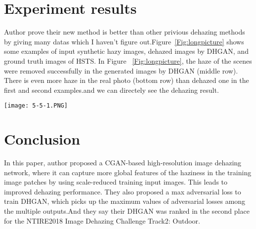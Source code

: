 \documentclass[10pt,twocolumn,letterpaper]{article}
\begin{document}
\section{Experiment results}
Author prove their new method is better than other privious dehazing methods by giving many datas which I haven't figure out.Figure~\ref{Fig:longpicture} shows some examples of input synthetic hazy images, dehazed images by DHGAN, and ground truth images of HSTS. In Figure ~\ref{Fig:longpicture}, the haze of the scenes were removed successfully in the generated images by DHGAN (middle row). There is even more haze in the real photo (bottom row) than dehazed one in the first and second examples.and we can directely see the dehazing result.

\begin{figure*}[htp]
\centering
\texttt{[image: 5-5-1.PNG]}
\caption{Some examples of (top row) input synthetic hazy images, (middle row) dehazed images by DHGAN and (bottom row) ground truth images of HSTS}
\label{Fig:longpicture}
\end{figure*}

\section{Conclusion}
In this paper, author proposed a CGAN-based high-resolution image dehazing network, where it can capture more global features of the haziness in the training image patches by using scale-reduced training input images. This leads to improved dehazing performance. They also proposed a max adversarial loss to train DHGAN, which picks up the maximum values of adversarial losses among
the multiple outputs.And they say their DHGAN was ranked in the second place for the NTIRE2018 Image Dehazing Challenge Track2: Outdoor.

{\small


}
\end{document}
